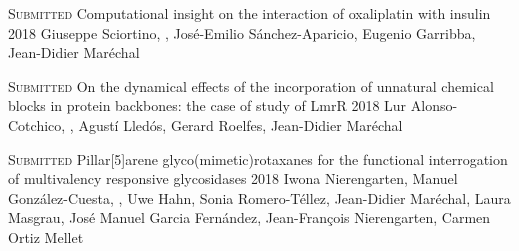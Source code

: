 

\hspace*{\fill}\bodyfontlight\footnotesize{}

\begin{cventries}

  \pubentry
    {\scshape{Submitted}} %
    {Computational insight on the interaction of oxaliplatin with insulin} %
    {2018} %
    {} %
    {Giuseppe Sciortino, , José-Emilio Sánchez-Aparicio, Eugenio Garribba, Jean-Didier Maréchal} %
    {} %
    {} %

  \pubentry
    {\scshape{Submitted}} %
    {On the dynamical effects of the incorporation of unnatural chemical blocks in protein backbones: the case of study of LmrR} %
    {2018} %
    {} %
    {Lur Alonso-Cotchico, , Agustí Lledós, Gerard Roelfes, Jean-Didier Maréchal} %
    {} %
    {} %

  \pubentry
    {\scshape{Submitted}} %
    {Pillar[5]arene glyco(mimetic)rotaxanes for the functional interrogation of multivalency responsive glycosidases} %
    {2018} %
    {} %
    {Iwona Nierengarten, Manuel González-Cuesta, , Uwe Hahn, Sonia Romero-Téllez, Jean-Didier Maréchal, Laura Masgrau, José Manuel Garcia Fernández, Jean-François Nierengarten, Carmen Ortiz Mellet} %
    {} %
    {} %

\end{cventries}


